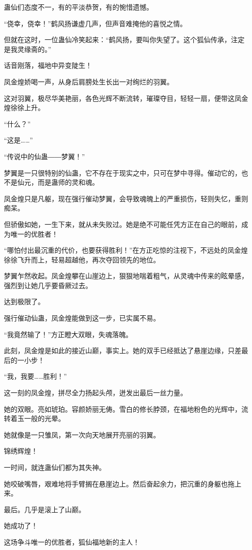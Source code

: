 \begin{this_body}
蛊仙们态度不一，有的平淡恭贺，有的惋惜遗憾。

“侥幸，侥幸！”鹤风扬谦虚几声，但声音难掩他的喜悦之情。

但就在这时，一位蛊仙冷笑起来：“鹤风扬，要叫你失望了。这个狐仙传承，注定是我灵缘斋的。”

话音刚落，福地中异变陡生！

凤金煌娇喝一声，从身后肩膀处生长出一对绚烂的羽翼。

这对羽翼，极尽华美艳丽，各色光辉不断流转，璀璨夺目，轻轻一扇，便带这凤金煌徐徐上升。

“什么？”

“这是……”

“传说中的仙蛊――梦翼！”

梦翼是一只很特别的仙蛊，它不存在于现实之中，只可在梦中寻得。催动它的，也不是仙元，而是蛊师的灵和魂。

凤金煌只是凡躯，现在强行催动梦翼，会导致魂魄上的严重损伤，轻则失忆，重则痴呆。

但骄傲如她，一生下来，就从未失败过。她是绝不可能任凭方正在自己的眼前，成为唯一的优胜者！

“哪怕付出最沉重的代价，也要获得胜利！”在方正吃惊的注视下，不远处的凤金煌徐徐飞升而上，轻易超越他，再次夺回领先的地位。

梦翼乍然收起。凤金煌攀在山崖边上，狠狠地喘着粗气，从灵魂中传来的眩晕感，强烈到让她几乎要昏厥过去。

达到极限了。

强行催动仙蛊，凤金煌能做到这一步，已实属不易。

“我竟然输了！”方正瞪大双眼，失魂落魄。

此刻，凤金煌是如此的接近山巅，事实上。她的双手已经抵达了悬崖边缘，只差最后的一小步！

“我，我要……胜利！”

这一刻的凤金煌，拼尽全力扬起头颅，迸发出最后一丝力量。

她的双眼。亮如琥珀。容颜娇丽无俦。雪白的修长脖颈，在福地粉色的光辉中，流转着玉一般的光晕。

她就像是一只雏凤，第一次向天地展开亮丽的羽翼。

锦绣辉煌！

一时间，就连蛊仙们都为其失神。

她咬破嘴唇，艰难地将手臂搁在悬崖边上。然后奋起余力，把沉重的身躯也拖上来。

最后。几乎是滚上了山巅。

她成功了！

这场争斗唯一的优胜者，狐仙福地新的主人！


\end{this_body}
